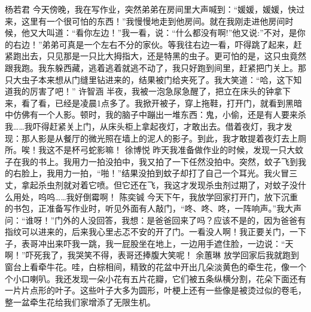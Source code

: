 {}\markdownRendererInterblockSeparator
{}杨若君\markdownRendererInterblockSeparator
{}今天傍晚，我在写作业，突然弟弟在房间里大声喊到：“媛媛，媛媛，快过来，这里有一个很可怕的东西！”我慢慢地走到他房间。就在我刚走进他房间时候，他又大叫道：“看你左边！”我一看，说：“什么都没有啊!”他又说:”不对，是你的右边！”弟弟可真是一个左右不分的家伙。等我往右边一看，吓得跳了起来，赶紧跑出去，只见那是一只比大拇指大，还是特黑的虫子。更可怕的是，这只虫竟然跟我跑。我东躲西藏，逃着逃着就逃不动了，我只好跑到间里，赶紧把门关上。那只大虫子本来想从门缝里钻进来的，结果被门给夹死了。我大笑道：“哈，这下知道我的厉害了吧！”\markdownRendererInterblockSeparator
{}\markdownRendererInterblockSeparator
{}许智涵\markdownRendererInterblockSeparator
{}半夜，我被一泡急尿急醒了，把立在床头的钟拿下来，看了看，已经是凌晨1点多了。我掀开被子，穿上拖鞋，打开门，就看到黑暗中仿佛有一个人影。顿时，我的脑子中蹦出一堆东西：鬼，小偷，还是有人要来杀我……我吓得赶紧关上门，从床头柜上拿起夜灯，才敢出去。借着夜灯，我才发现：那人影是从餐厅的微光照在墙上的泥人的影子。到此，我才敢提着夜灯去上厕所。唉！我这不是杯弓蛇影嘛！\markdownRendererInterblockSeparator
{}\markdownRendererInterblockSeparator
{}徐博悦\markdownRendererInterblockSeparator
{}昨天我准备做作业的时候，发现一只大蚊子在我的书上。我用力一拍没拍中，我又拍了一下任然没拍中。突然，蚊子飞到我的右脸上，我用力一拍，“啪！”结果没拍到蚊子却打了自己一个耳光。我火冒三丈，拿起杀虫剂就对着它喷。但它还在飞，我这才发现杀虫剂过期了，对蚊子没什么用处，呜呜……我好倒霉啊！\markdownRendererInterblockSeparator
{}\markdownRendererInterblockSeparator
{}陈奕铖\markdownRendererInterblockSeparator
{}今天下午，我放学回家打开门，放下沉重的书包，正准备写作业时，听见外面有人敲门，“咚、咚、咚，一阵响声。”我大声问：“谁呀！”门外的人没回答，我想：是爸爸回来了吗？应该不是的，因为爸爸有指纹可以进来的，后来我心里忐忑不安的开了门。一看没人啊！我正要关门，一下子，表哥冲出来吓我一跳，我一屁股坐在地上，一边用手遮住脸，一边说：“天啊！”吓死我了，我哭笑不得，表哥还捧腹大笑呢！\markdownRendererInterblockSeparator
{}\markdownRendererInterblockSeparator
{}余蕙琳\markdownRendererInterblockSeparator
{}放学回家后我就跑到窗台上看牵牛花。哇，白棕相间，精致的花盆中开出几朵淡黄色的牵生花，像一个个小口喇叭。我还发现一朵小花有五片花瓣，它们被五条纵横分割，花朵下面还有一片片点形的叶子。这些叶子大多为圆形，叶梗上还有一些像是被烫过似的卷毛，整一盆牵生花给我们家增添了无限生机。\markdownRendererInterblockSeparator
